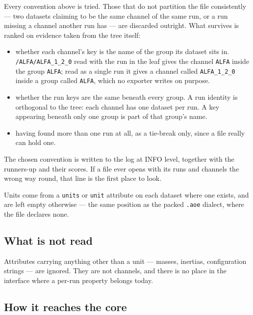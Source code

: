 \documentclass[11pt,a4paper,oneside]{report}
\newcommand{\code}[1]{\texttt{#1}}
\begin{document}
Every convention above is tried. Those that do not partition the file
consistently --- two datasets claiming to be the same channel of the same run,
or a run missing a channel another run has --- are discarded outright. What
survives is ranked on evidence taken from the tree itself:

\begin{itemize}
  \item whether each channel's key is the name of the group its dataset sits in.
        \code{/ALFA/ALFA\_1\_2\_0} read with the run in the leaf gives the
        channel \code{ALFA} inside the group \code{ALFA}; read as a single run
        it gives a channel called \code{ALFA\_1\_2\_0} inside a group called
        \code{ALFA}, which no exporter writes on purpose.
  \item whether the run keys are the same beneath every group. A run identity is
        orthogonal to the tree: each channel has one dataset per run. A key
        appearing beneath only one group is part of that group's name.
  \item having found more than one run at all, as a tie-break only, since a file
        really can hold one.
\end{itemize}

\begin{aoenote}
The chosen convention is written to the log at INFO level, together with the
runners-up and their scores. If a file ever opens with its runs and channels
the wrong way round, that line is the first place to look.
\end{aoenote}

Units come from a \code{units} or \code{unit} attribute on each dataset where
one exists, and are left empty otherwise --- the same position as the packed
\code{.aoe} dialect, where the file declares none.

\subsection*{What is not read}

Attributes carrying anything other than a unit --- masses, inertias,
configuration strings --- are ignored. They are not channels, and there is no
place in the interface where a per-run property belongs today.

\subsection*{How it reaches the core}
\end{document}
